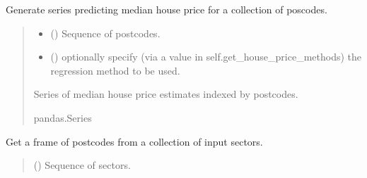 \documentclass[letterpaper,10pt,english]{sphinxmanual}
\begin{document}
\begin{fulllineitems}
\begin{fulllineitems}
\end{fulllineitems}


\begin{fulllineitems}
\label{\detokenize{index:flood_tool.Tool.get_median_house_price_estimate}}
\pysigstartsignatures
{}
\pysigstopsignatures
\sphinxAtStartPar
Generate series predicting median house price for a collection
of poscodes.
\begin{quote}\begin{description}
\begin{itemize}
\item {} 
\sphinxAtStartPar
{} () \textendash{} Sequence of postcodes.

\item {} 
\sphinxAtStartPar
{} (\sphinxstyleliteralemphasis{\sphinxupquote{ (}}\sphinxstyleliteralemphasis{\sphinxupquote{)}}) \textendash{} optionally specify (via a value in
self.get\_house\_price\_methods) the regression
method to be used.

\end{itemize}

\sphinxAtStartPar
Series of median house price estimates indexed by postcodes.

\sphinxAtStartPar
pandas.Series

\end{description}\end{quote}

\end{fulllineitems}


\begin{fulllineitems}
\label{\detokenize{index:flood_tool.Tool.get_postcode_from_sector}}
\pysigstartsignatures
{}
\pysigstopsignatures
\sphinxAtStartPar
Get a frame of postcodes from a collection
of input sectors.
\begin{quote}\begin{description}
\sphinxAtStartPar
{} () \textendash{} Sequence of sectors.


\end{description}
\end{quote}
\end{fulllineitems}
\end{fulllineitems}
\end{document}
